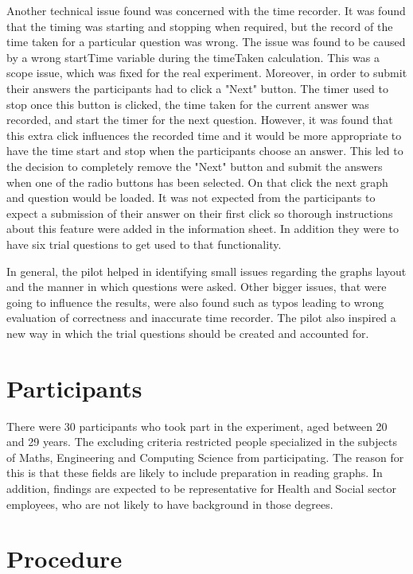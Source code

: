 \documentclass{l4proj}
\begin{document}
Another technical issue found was concerned with the time recorder. It was found that the timing was starting and stopping when required, but the record of the time taken for a particular question was wrong. The issue was found to be caused by a wrong startTime variable during the timeTaken calculation. This was a scope issue, which was fixed for the real experiment. Moreover, in order to submit their answers the participants had to click a "Next" button. The timer used to stop once this button is clicked, the time taken for the current answer was recorded, and start the timer for the next question. However, it was found that this extra click influences the recorded time and it would be more appropriate to have the time start and stop when the participants choose an answer. This led to the decision to completely remove the "Next" button and submit the answers when one of the radio buttons has been selected. On that click the next graph and question would be loaded. It was not expected from the participants to expect a submission of their answer on their first click so thorough instructions about this feature were added in the information sheet. In addition they were to have six trial questions to get used to that functionality. 
 
In general, the pilot helped in identifying small issues regarding the graphs layout and the manner in which questions were asked. Other bigger issues, that were going to influence the results, were also found such as typos leading to wrong evaluation of correctness and inaccurate time recorder. The pilot also inspired a new way in which the trial questions should be created and accounted for.

\section{Participants}
There were 30 participants who took part in the experiment, aged between 20 and 29 years. The excluding criteria restricted people specialized in the subjects of Maths, Engineering and Computing Science from participating. The reason for this is that these fields are likely to include preparation in reading graphs. In addition, findings are expected to be representative for Health and Social sector employees, who are not likely to have background in those degrees.

\section{Procedure}
\end{document}
